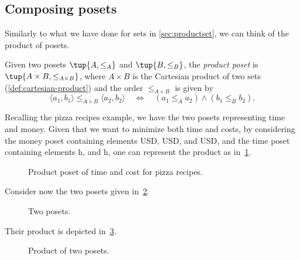 \subsection{Composing posets}
Similarly to what we have done for sets in \cref{sec:productset}, we can think of the product of posets.

\begin{definition}
\label{def:productposet}
Given two posets $\tup{A, \leq_A}$
and  $\tup{B, \leq_B}$, the \emph{product poset} is $\tup{A \times B, \leq_{A\times B}}$, where $A \times B$ is the Cartesian product of two sets (\cref{def:cartesian-product}) and the order $\leq_{A\times B}$ is given by
\begin{equation}
        \langle a_1, b_1 \rangle
        \leq_{A\times B}
        \langle a_2, b_2 \rangle
        \quad
        \Leftrightarrow
        \quad
        ( a_1 \leq_A a_2) \wedge
        (b_1 \leq_B b_2).
    \end{equation}
\end{definition}
Recalling the pizza recipes example, we have the two posets representing time and money. Given that we want to minimize both time and costs, by considering the money poset containing elements \unit[1]{USD}, \unit[2]{USD}, and \unit[3]{USD}, and the time poset containing elements \unit[1]{h}, and \unit[2]{h}, one can represent the product as in~\cref{fig:productpizza}.

\begin{figure}[h!]
\begin{center}
\end{center}
\caption{Product poset of time and cost for pizza recipes.\label{fig:productpizza}}
\end{figure}


\begin{example}
Consider now the two posets given in~\cref{fig:composing_posets_1}.
\begin{figure}[h!]
\begin{center}
\end{center}
\caption{Two posets. \label{fig:composing_posets_1}}
\end{figure}
Their product is depicted in~\cref{fig:composing_posets_2}.
\begin{figure}[h!]
\begin{center}
\end{center}
\caption{Product of two posets. \label{fig:composing_posets_2}}
\end{figure}
\end{example}


